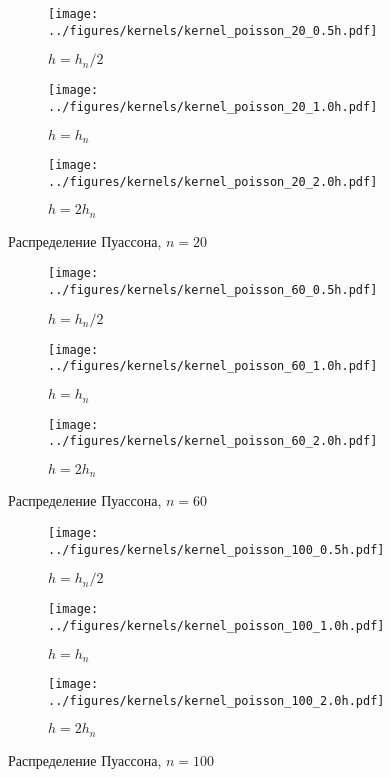 \documentclass[12pt]{report}
\begin{document}
	\begin{figure}[H]
		\centering
		\begin{subfigure}[t]{.3\linewidth}
			\centering\texttt{[image: ../figures/kernels/kernel\_poisson\_20\_0.5h.pdf]}
			\caption*{$h = h_n/2$}
		\end{subfigure}
		\begin{subfigure}[t]{.3\linewidth}
			\centering\texttt{[image: ../figures/kernels/kernel\_poisson\_20\_1.0h.pdf]}
			\caption*{$h = h_n$}
		\end{subfigure}
		\begin{subfigure}[t]{.3\linewidth}
			\centering\texttt{[image: ../figures/kernels/kernel\_poisson\_20\_2.0h.pdf]}
			\caption*{$h = 2h_n$}
		\end{subfigure}
		\caption{Распределение Пуассона, $n = 20$}
	\end{figure}
	\begin{figure}[H]
		\centering
		\begin{subfigure}[t]{.3\linewidth}
			\centering\texttt{[image: ../figures/kernels/kernel\_poisson\_60\_0.5h.pdf]}
			\caption*{$h = h_n/2$}
		\end{subfigure}
		\begin{subfigure}[t]{.3\linewidth}
			\centering\texttt{[image: ../figures/kernels/kernel\_poisson\_60\_1.0h.pdf]}
			\caption*{$h = h_n$}
		\end{subfigure}
		\begin{subfigure}[t]{.3\linewidth}
			\centering\texttt{[image: ../figures/kernels/kernel\_poisson\_60\_2.0h.pdf]}
			\caption*{$h = 2h_n$}
		\end{subfigure}
		\caption{Распределение Пуассона, $n = 60$}
	\end{figure}
	\begin{figure}[H]
		\centering
		\begin{subfigure}[t]{.3\linewidth}
			\centering\texttt{[image: ../figures/kernels/kernel\_poisson\_100\_0.5h.pdf]}
			\caption*{$h = h_n/2$}
		\end{subfigure}
		\begin{subfigure}[t]{.3\linewidth}
			\centering\texttt{[image: ../figures/kernels/kernel\_poisson\_100\_1.0h.pdf]}
			\caption*{$h = h_n$}
		\end{subfigure}
		\begin{subfigure}[t]{.3\linewidth}
			\centering\texttt{[image: ../figures/kernels/kernel\_poisson\_100\_2.0h.pdf]}
			\caption*{$h = 2h_n$}
		\end{subfigure}
		\caption{Распределение Пуассона, $n = 100$}
	\end{figure}
\end{document}
